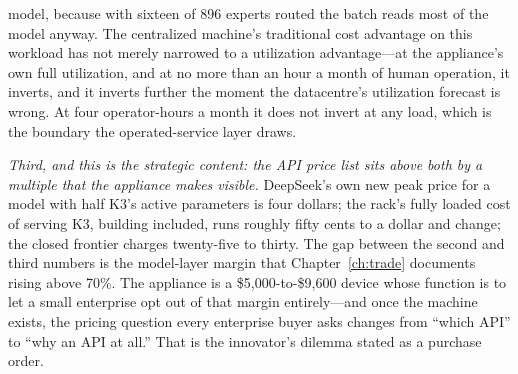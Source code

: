 model, because with sixteen of 896 experts routed the batch reads most of the model anyway. The centralized machine's traditional cost advantage on this workload has not merely narrowed to a utilization advantage---at the appliance's own full utilization, and at no more than an hour a month of human operation, it inverts, and it inverts further the moment the datacentre's utilization forecast is wrong. At four operator-hours a month it does not invert at any load, which is the boundary the operated-service layer draws.

\emph{Third, and this is the strategic content: the API price list sits above both by a multiple that the appliance makes visible.} DeepSeek's own new peak price for a model with half K3's active parameters is four dollars; the rack's fully loaded cost of serving K3, building included, runs roughly fifty cents to a dollar and change; the closed frontier charges twenty-five to thirty. The gap between the second and third numbers is the model-layer margin that Chapter~\ref{ch:trade} documents rising above 70\%. The appliance is a \$5,000-to-\$9,600 device whose function is to let a small enterprise opt out of that margin entirely---and once the machine exists, the pricing question every enterprise buyer asks changes from ``which API'' to ``why an API at all.'' That is the innovator's dilemma stated as a purchase order.

